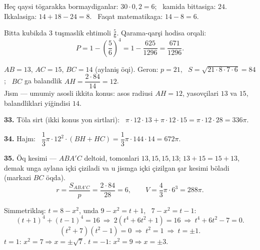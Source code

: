 Heç qaysi tögarakka bormaydiganlar: $30\cdot0{,}2=6$; \ kamida bittasiga: $24$.\\
Ikkalasiga: $14+18-24=8$. \ Faqat matematikaga: $14-8=6$.

Bitta kubikda 3 tuşmaslik ehtimoli $\frac56$. Qarama-qarşi hodisa orqali:
\[P=1-\left(\frac56\right)^4=1-\frac{625}{1296}=\frac{671}{1296}.\]

\newpage
{}
$AB=13$, $AC=15$, $BC=14$ (aylaniş öqi). Geron: $p=21$, \ $S=\sqrt{21\cdot8\cdot7\cdot6}=84$; \ $BC$ ga balandlik $AH=\dfrac{2\cdot84}{14}=12$.\\
Jism — umumiy asosli ikkita konus: asos radiusi $AH=12$, yasovçilari $13$ va $15$, balandliklari yiğindisi $14$.

\textbf{33.} Töla sirt (ikki konus yon sirtlari): \ $\pi\cdot12\cdot13+\pi\cdot12\cdot15=\pi\cdot12\cdot28=336\pi$.

\textbf{34.} Hajm: \ $\dfrac13\pi\cdot12^2\cdot(BH+HC)=\dfrac13\pi\cdot144\cdot14=672\pi$.

\textbf{35.} Öq kesimi — $ABA'C$ deltoid, tomonlari $13,15,15,13$; $13+15=15+13$, demak unga aylana içki çiziladi va u jismga içki çizilgan şar kesimi böladi (markazi $BC$ öqda).
\[r=\frac{S_{ABA'C}}{p}=\frac{2\cdot84}{28}=6,\qquad V=\frac43\pi\cdot6^3=288\pi.\]

\newpage
{}
Simmetriklaş: $t=8-x^2$, unda $9-x^2=t+1$, \ $7-x^2=t-1$:
\[(t+1)^4+(t-1)^4=16\ \Rightarrow\ 2\left(t^4+6t^2+1\right)=16\ \Rightarrow\ t^4+6t^2-7=0.\]
\[\left(t^2+7\right)\left(t^2-1\right)=0\ \Rightarrow\ t^2=1\ \Rightarrow\ t=\pm1.\]
$t=1$: $x^2=7\Rightarrow x=\pm\sqrt7$. \quad $t=-1$: $x^2=9\Rightarrow x=\pm3$.

